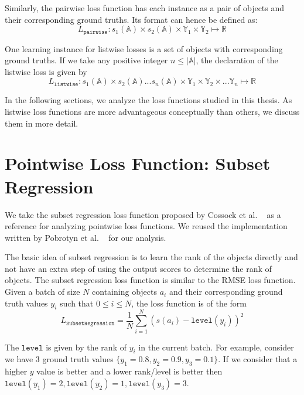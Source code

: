\documentclass[12pt, twoside, ngerman]{report}
\begin{document}
Similarly,  the pairwise loss function has each instance as a pair of objects and their corresponding ground truths. Its format can hence be defined as:
\begin{equation}
L_{\texttt{pairwise}} : s_1(\mathbb{A}) \times s_2(\mathbb{A}) \times \mathbb{Y}_1 \times \mathbb{Y}_2 \mapsto \mathbb{R}
\end{equation}

One learning instance for listwise losses is a set of objects with corresponding ground truths.
If we take any positive integer $n \leq |\mathbb{A}|$,  the declaration of the listwise loss is given by
\begin{equation}
L_{\texttt{listwise}} : s_1(\mathbb{A}) \times s_2(\mathbb{A}) ...  s_{n}(\mathbb{A}) \times \mathbb{Y}_1 \times \mathbb{Y}_2 \times ...  \mathbb{Y}_{n} \mapsto \mathbb{R}
\end{equation}

In the following sections, we analyze the loss functions studied in this thesis.
As listwise loss functions are more advantageous conceptually than others, we discuss them in more detail.

\section{Pointwise Loss Function: Subset Regression}

We take the subset regression loss function proposed by Cossock et al. ~\cite{subsetregressionpaper} as a reference for analyzing pointwise loss functions.
We reused the implementation written by Pobrotyn et al. ~\cite{Pobrotyn2020ContextAwareLT} for our analysis.


The basic idea of subset regression is to learn the rank of the objects directly and not have an extra step of using the output scores to determine the rank of objects.
The subset regression loss function is similar to the RMSE loss function.
Given a batch of size $N$ containing objects $a_i$ and their corresponding ground truth values $y_i$ such that $0 \leq i \leq N$,  the loss function is of the form
\begin{equation}
L_{\texttt{SubsetRegression}} = \frac{1}{N} \sum\limits_{i=1}^{N} (s(a_i) - \texttt{level}(y_i))^2
\end{equation}

The $\texttt{level}$ is given by the rank of $y_i$ in the current batch.
For example,  consider we have 3 ground truth values $\{y_1 = 0.8, y_2 = 0.9, y_3 = 0.1\}$.
If we consider that a higher $y$ value is better and a lower rank/level is better then 
$\texttt{level}(y_1) = 2,  \texttt{level}(y_2) = 1,  \texttt{level}(y_3) = 3$.
\end{document}
